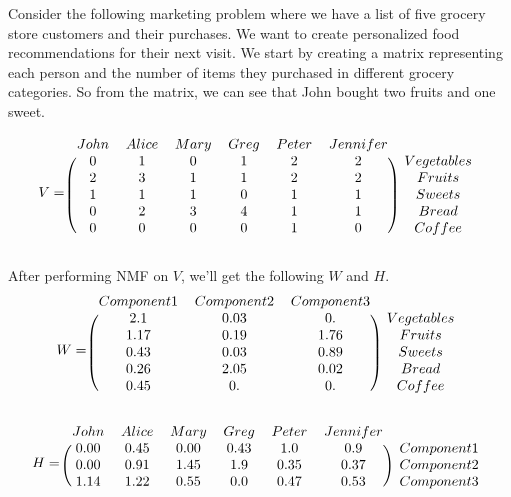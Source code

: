 Consider the following marketing problem where we have a list of five grocery store customers and their purchases.
We want to create personalized food recommendations for their next visit.
We start by creating a matrix representing each person and the number of items they purchased in different grocery categories.
So from the matrix, we can see that John bought two fruits and one sweet.
%

\[
V =
\begin{blockarray}{ccccccc}
  John & Alice & Mary & Greg & Peter & Jennifer \\
  \begin{block}{(cccccc)c}
     0 & 1 & 0 & 1 & 2 & 2 & Vegetables \\
     2 & 3 & 1 & 1 & 2 & 2 & Fruits \\
     1 & 1 & 1 & 0 & 1 & 1 & Sweets \\
     0 & 2 & 3 & 4 & 1 & 1 & Bread \\
     0 & 0 & 0 & 0 & 1 & 0 & Coffee \\
  \end{block}
  \end{blockarray}
\]

After performing NMF on $V$, we'll get the following $W$ and $H$.
\[
W =
\begin{blockarray}{cccc}
   Component 1 & Component 2 & Component 3\\
  \begin{block}{(ccc)c}
	2.1 & 0.03 & 0. & Vegetables\\
	1.17 & 0.19 & 1.76 & Fruits\\
    0.43 & 0.03 & 0.89 & Sweets\\
    0.26 & 2.05 & 0.02 & Bread\\
    0.45 & 0.  & 0.  & Coffee\\
   \end{block}
   \end{blockarray}
\]

\[
H =
\begin{blockarray}{ccccccc}
  John & Alice & Mary & Greg & Peter & Jennifer\\
  \begin{block}{(cccccc)c}
   0.00  & 0.45 & 0.00 & 0.43 &  1.0   &   0.9 & Component 1\\
   0.00  & 0.91 & 1.45 & 1.9 &  0.35   &   0.37 & Component 2\\
   1.14  & 1.22 & 0.55 & 0.0 &  0.47   &   0.53 & Component 3\\
   \end{block}
   \end{blockarray}
\]

